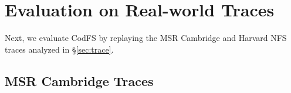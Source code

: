 \section{Evaluation on Real-world Traces}
\label{eval:trace}

Next, we evaluate CodFS by replaying the MSR Cambridge and Harvard NFS traces
analyzed in \S\ref{sec:trace}.

\subsection {MSR Cambridge Traces}
